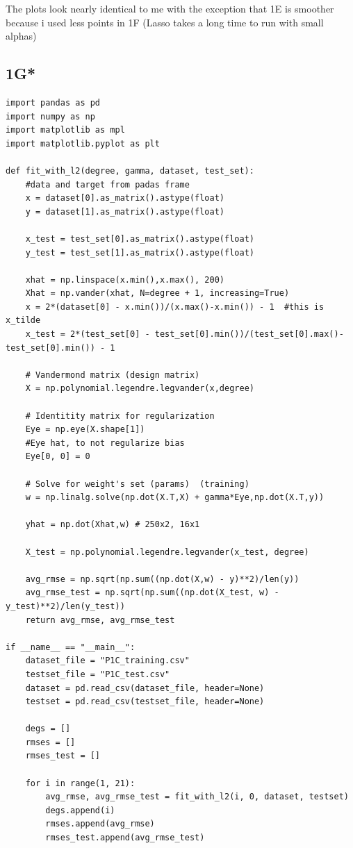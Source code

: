 \documentclass[12pt]{article}
\begin{document}
\begin{flushleft}
		\vspace{0.5cm}
		The plots look nearly identical to me with the exception that 1E is smoother because i used less points in 1F (Lasso takes a long time to run with small alphas)
		
		\subsection*{1G*}
\begin{lstlisting}
import pandas as pd
import numpy as np
import matplotlib as mpl
import matplotlib.pyplot as plt

def fit_with_l2(degree, gamma, dataset, test_set):
	#data and target from padas frame
	x = dataset[0].as_matrix().astype(float)
	y = dataset[1].as_matrix().astype(float)
	
	x_test = test_set[0].as_matrix().astype(float)
	y_test = test_set[1].as_matrix().astype(float)
	
	xhat = np.linspace(x.min(),x.max(), 200)
	Xhat = np.vander(xhat, N=degree + 1, increasing=True)
	x = 2*(dataset[0] - x.min())/(x.max()-x.min()) - 1  #this is x_tilde
	x_test = 2*(test_set[0] - test_set[0].min())/(test_set[0].max()-test_set[0].min()) - 1
	
	# Vandermond matrix (design matrix)
	X = np.polynomial.legendre.legvander(x,degree)
	
	# Identitity matrix for regularization
	Eye = np.eye(X.shape[1])
	#Eye hat, to not regularize bias
	Eye[0, 0] = 0
	
	# Solve for weight's set (params)  (training)
	w = np.linalg.solve(np.dot(X.T,X) + gamma*Eye,np.dot(X.T,y))
	
	yhat = np.dot(Xhat,w) # 250x2, 16x1
	
	X_test = np.polynomial.legendre.legvander(x_test, degree)
	
	avg_rmse = np.sqrt(np.sum((np.dot(X,w) - y)**2)/len(y))
	avg_rmse_test = np.sqrt(np.sum((np.dot(X_test, w) - y_test)**2)/len(y_test))
	return avg_rmse, avg_rmse_test

if __name__ == "__main__":
	dataset_file = "P1C_training.csv"
	testset_file = "P1C_test.csv"
	dataset = pd.read_csv(dataset_file, header=None)
	testset = pd.read_csv(testset_file, header=None)
	
	degs = []
	rmses = []
	rmses_test = []
	
	for i in range(1, 21):
		avg_rmse, avg_rmse_test = fit_with_l2(i, 0, dataset, testset)
		degs.append(i)
		rmses.append(avg_rmse)
		rmses_test.append(avg_rmse_test)
	

\end{lstlisting}
\end{flushleft}
\end{document}
